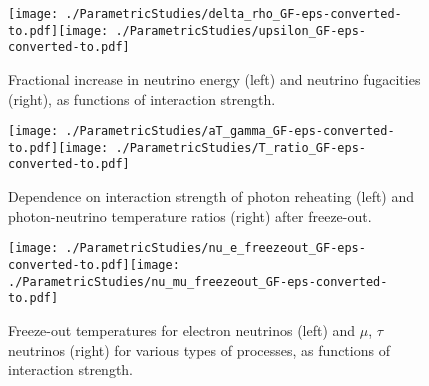 \begin{subappendices}
\begin{figure}[H]
\centerline{\texttt{[image: ./ParametricStudies/delta\_rho\_GF-eps-converted-to.pdf]}\hspace{-5mm}\texttt{[image: ./ParametricStudies/upsilon\_GF-eps-converted-to.pdf]}}
\caption{Fractional increase in neutrino energy (left) and neutrino fugacities (right), as functions of interaction strength.}
 \end{figure}




\begin{figure}[H]
\centerline{\texttt{[image: ./ParametricStudies/aT\_gamma\_GF-eps-converted-to.pdf]}\hspace{-5mm}\texttt{[image: ./ParametricStudies/T\_ratio\_GF-eps-converted-to.pdf]}}
\caption{Dependence on  interaction strength of photon reheating (left) and photon-neutrino temperature ratios (right) after freeze-out.}
 \end{figure}



\begin{figure}[H]
\centerline{\texttt{[image: ./ParametricStudies/nu\_e\_freezeout\_GF-eps-converted-to.pdf]}\hspace{5mm}\texttt{[image: ./ParametricStudies/nu\_mu\_freezeout\_GF-eps-converted-to.pdf]}}
\caption{Freeze-out temperatures for electron neutrinos (left) and $\mu$, $\tau$ neutrinos (right) for various types of processes, as functions of interaction strength.}
 \end{figure}

\end{subappendices}

